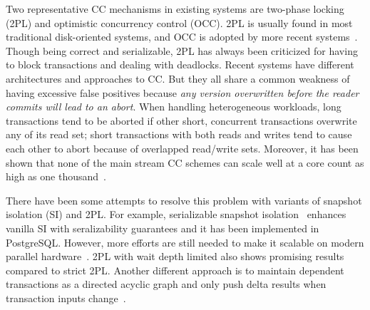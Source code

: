\documentclass[preprint]{sig-alternate-nocprt}
\begin{document}
Two representative CC mechanisms in existing systems are two-phase locking (2PL) and optimistic concurrency control (OCC). 2PL is usually found in most traditional disk-oriented systems, and OCC is adopted by more recent systems~\cite{Hekaton,Silo}. Though being correct and serializable, 2PL has always been criticized for having to block transactions and dealing with deadlocks. Recent systems have different architectures and approaches to CC. But they all share a common weakness of having excessive false positives because \textit{any version overwritten before the reader commits will lead to an abort}. When handling heterogeneous workloads, long transactions tend to be aborted if other short, concurrent transactions overwrite any of its read set; short transactions with both reads and writes tend to cause each other to abort because of overlapped read/write sets. Moreover, it has been shown that none of the main stream CC schemes can scale well at a core count as high as one thousand~\cite{CCAbyss}.

There have been some attempts to resolve this problem with variants of snapshot isolation (SI) and 2PL. For example, serializable snapshot isolation~\cite{SSI} enhances vanilla SI with seralizability guarantees and it has been implemented in PostgreSQL. However, more efforts are still needed to make it scalable on modern parallel hardware~\cite{ScalableSSI}. 2PL with wait depth limited also shows promising results compared to strict 2PL. Another different approach is to maintain dependent transactions as a directed acyclic graph and only push delta results when transaction inputs change~\cite{LogicBlox}.




\end{document}
